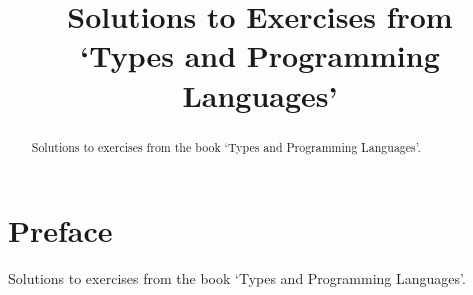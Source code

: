 \documentclass{amsbook}
\theoremstyle{definition}
\numberwithin{equation}{section}
\theoremstyle{definition}
\begin{document}
\frontmatter
\title[Solutions to exercises from `Types and Programming
 Languages']{Solutions to Exercises from \\
 `Types and Programming Languages'}

\begin{abstract}
   Solutions to exercises from the book `Types and Programming
   Languages'.
\end{abstract}

\maketitle
\tableofcontents


\chapter*{Preface}

 Solutions to exercises from the book
`Types and Programming Languages'.

\mainmatter



\end{document}
